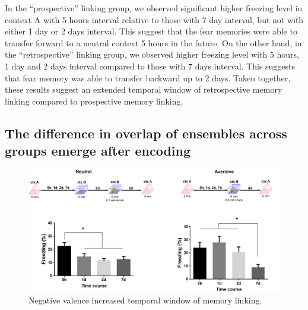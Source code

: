 \documentclass[master.tex]{subfiles}
\begin{document}
In the ``prospective'' linking group, we observed significant higher freezing level
in context A with 5 hours interval relative to those with 7 day interval, but
not with either 1 day or 2 days interval. This suggest that the fear memories
were able to transfer forward to a neutral context 5 hours in the future. On the
other hand, in the ``retrospective'' linking group, we observed higher freezing
level with 5 hours, 1 day and 2 days interval compared to those with 7 days
interval. This suggests that fear memory was able to transfer backward up to 2
days. Taken together, these results suggest an extended temporal window of
retrospective memory linking compared to prospective memory linking.

\subsection*{The difference in overlap of ensembles across groups emerge after
  encoding}

\begin{figure}
  \centering \includegraphics[scale = .095]{Figures/val_retro_prelim.pdf}
  \caption{\footnotesize Negative valence increased temporal window of memory
    linking.}
  \label{fig:prelim_val}
\end{figure}

\end{document}
